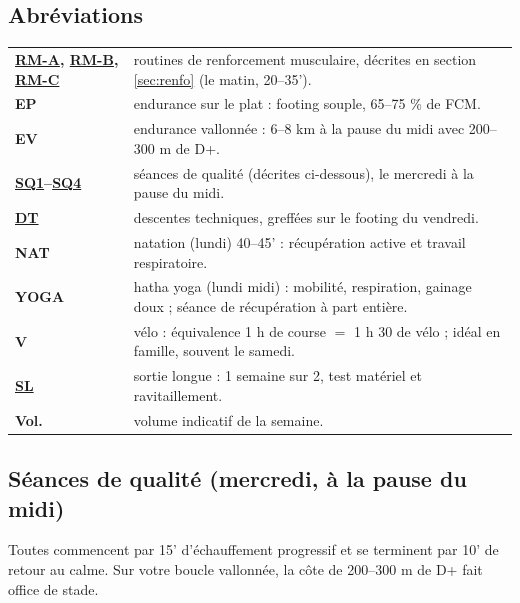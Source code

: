 \documentclass[10pt,a4paper]{article}
\newcommand{\key}[1]{\textbf{\sffamily\small\color{acc}#1}}
\newcommand{\rma}{\hyperlink{rm-a}{RM-A}}
\newcommand{\rmb}{\hyperlink{rm-b}{RM-B}}
\newcommand{\rmc}{\hyperlink{rm-c}{RM-C}}
\newcommand{\sqa}{\hyperlink{sq1}{SQ1}}
\newcommand{\sqd}{\hyperlink{sq4}{SQ4}}
\newcommand{\dtl}{\hyperlink{dt}{DT}}
\newcommand{\sln}{\hyperlink{legende}{SL}}
\begin{document}
\hypertarget{legende}{}
\subsection{Abr\'eviations}
\begin{center}
\begin{tabularx}{\textwidth}{@{}lX@{}}
\toprule
\key{\rma{}, \rmb{}, \rmc{}} & routines de renforcement musculaire, d\'ecrites en section \ref{sec:renfo} (le matin, 20--35').\\
\key{EP} & endurance sur le plat : footing souple, 65--75 \% de FCM.\\
\key{EV} & endurance vallonn\'ee : 6--8 km \`a la pause du midi avec 200--300 m de D+.\\
\key{\sqa{}--\sqd{}} & s\'eances de qualit\'e (d\'ecrites ci-dessous), le mercredi \`a la pause du midi.\\
\key{\dtl{}} & descentes techniques, greff\'ees sur le footing du vendredi.\\
\key{NAT} & natation (lundi) 40--45' : r\'ecup\'eration active et travail respiratoire.\\
\key{YOGA} & hatha yoga (lundi midi) : mobilit\'e, respiration, gainage doux ; s\'eance de r\'ecup\'eration \`a part enti\`ere.\\
\key{V} & v\'elo : \'equivalence 1 h de course $=$ 1 h 30 de v\'elo ; id\'eal en famille, souvent le samedi.\\
\key{\sln{}} & sortie longue : 1 semaine sur 2, test mat\'eriel et ravitaillement.\\
\key{Vol.} & volume indicatif de la semaine.\\
\bottomrule
\end{tabularx}
\end{center}

\subsection{S\'eances de qualit\'e (mercredi, \`a la pause du midi)}
Toutes commencent par 15' d'\'echauffement progressif et se terminent par
10' de retour au calme. Sur votre boucle vallonn\'ee, la c\^ote de 200--300 m
de D+ fait office de stade.
\end{document}
